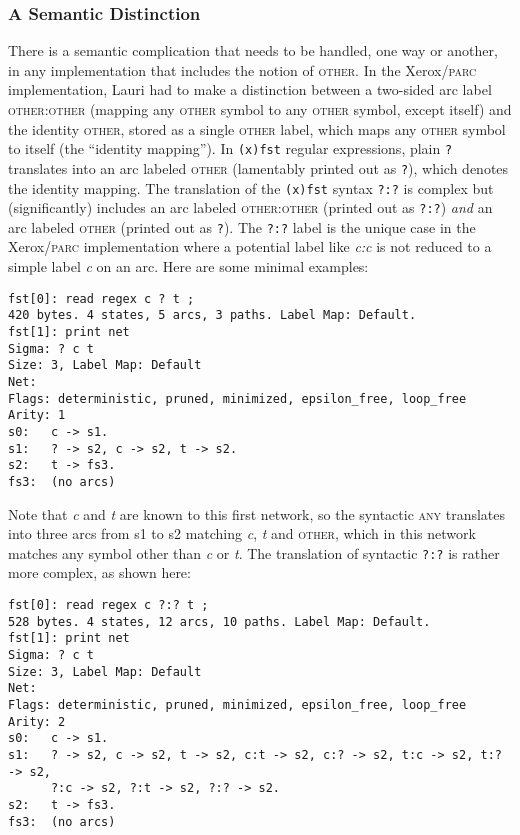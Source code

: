 \documentclass[letterpaper,11pt]{article}
\providecommand{\acro}{}\renewcommand{\acro}{\textsc}
\begin{document}
\subsubsection{A Semantic Distinction}

There is a semantic complication that needs to be handled, one way or
another, in any implementation that includes the notion of
\acro{other}. In the Xerox/\acro{parc} implementation, Lauri had to make  
a distinction between a two-sided arc label \acro{other}:\acro{other} 
(mapping any \acro{other} symbol to any  
\acro{other} symbol, except itself) and the identity \acro{other}, stored as a
single \acro{other} label, which maps any \acro{other} symbol
to itself (the ``identity mapping'').  In \texttt{(x)fst} regular expressions, plain
\texttt{?} translates into an arc labeled \acro{other} (lamentably printed out as
\texttt{?}), which denotes the identity mapping.  The translation of the 
\texttt{(x)fst} syntax \texttt{?:?} is complex but (significantly) includes an arc labeled
\acro{other:other} (printed out as \texttt{?:?}) \emph{and} an arc
labeled \acro{other} (printed out as \texttt{?}).  The \texttt{?:?} label is the unique case in the
Xerox/\acro{parc} implementation where a potential label like
\emph{c:c} is not reduced to a simple label
\emph{c} on an arc.  Here are some minimal examples:

\begin{Verbatim}[fontsize=\footnotesize]
fst[0]: read regex c ? t ;
420 bytes. 4 states, 5 arcs, 3 paths. Label Map: Default.
fst[1]: print net
Sigma: ? c t
Size: 3, Label Map: Default
Net: 
Flags: deterministic, pruned, minimized, epsilon_free, loop_free
Arity: 1
s0:   c -> s1.
s1:   ? -> s2, c -> s2, t -> s2.
s2:   t -> fs3.
fs3:  (no arcs)
\end{Verbatim}

\noindent
Note that \emph{c} and \emph{t} are known to this first network, so
the syntactic \acro{any} translates into three arcs from s1 to s2
matching \emph{c}, \emph{t} and \acro{other}, which in this network matches any
symbol other than \emph{c} or \emph{t}.  The translation of syntactic
\texttt{?:?} is rather more complex, as shown here:

\begin{Verbatim}[fontsize=\footnotesize]
fst[0]: read regex c ?:? t ;
528 bytes. 4 states, 12 arcs, 10 paths. Label Map: Default.
fst[1]: print net
Sigma: ? c t
Size: 3, Label Map: Default
Net: 
Flags: deterministic, pruned, minimized, epsilon_free, loop_free
Arity: 2
s0:   c -> s1.
s1:   ? -> s2, c -> s2, t -> s2, c:t -> s2, c:? -> s2, t:c -> s2, t:? -> s2,
      ?:c -> s2, ?:t -> s2, ?:? -> s2.
s2:   t -> fs3.
fs3:  (no arcs)
\end{Verbatim}
\end{document}
